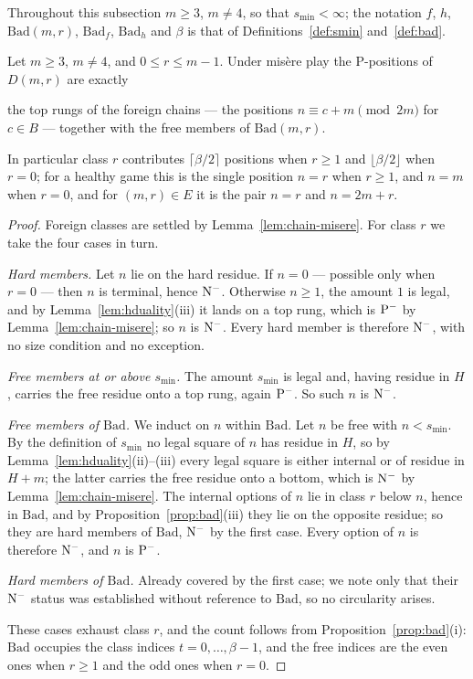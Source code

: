Throughout this subsection $m \ge 3$, $m \ne 4$, so that
$s_{\min} < \infty$; the notation $f$, $h$, $\mathrm{Bad}(m,r)$,
$\mathrm{Bad}_f$, $\mathrm{Bad}_h$ and $\beta$ is that of
Definitions~\ref{def:smin} and~\ref{def:bad}.

\begin{theorem}\label{thm:misere-main}
Let $m \ge 3$, $m \ne 4$, and $0 \le r \le m-1$. Under mis\`ere play the
P-positions of $D(m,r)$ are exactly

the top rungs of the foreign chains --- the positions
$n \equiv c + m \pmod{2m}$ for $c \in B$ --- together with the free
members of $\mathrm{Bad}(m,r)$.

In particular class $r$ contributes $\lceil \beta/2 \rceil$ positions
when $r \ge 1$ and $\lfloor \beta/2 \rfloor$ when $r = 0$; for a healthy
game this is the single position $n = r$ when $r \ge 1$, and $n = m$ when
$r = 0$, and for $(m,r) \in E$ it is the pair $n = r$ and $n = 2m + r$.
\end{theorem}
\begin{proof}
Foreign classes are settled by Lemma~\ref{lem:chain-misere}. For class
$r$ we take the four cases in turn.

\emph{Hard members.} Let $n$ lie on the hard residue. If $n = 0$ ---
possible only when $r = 0$ --- then $n$ is terminal, hence $\mathrm{N}^-$.
Otherwise $n \ge 1$, the amount $1$ is legal, and by
Lemma~\ref{lem:hduality}(iii) it lands on a top rung, which is $\mathrm{P}^-$ by
Lemma~\ref{lem:chain-misere}; so $n$ is $\mathrm{N}^-$. Every hard member is
therefore $\mathrm{N}^-$, with no size condition and no exception.

\emph{Free members at or above $s_{\min}$.} The amount $s_{\min}$ is
legal and, having residue in $H$, carries the free residue onto a top
rung, again $\mathrm{P}^-$. So such $n$ is $\mathrm{N}^-$.

\emph{Free members of $\mathrm{Bad}$.} We induct on $n$ within
$\mathrm{Bad}$. Let $n$ be free with $n < s_{\min}$. By the definition of
$s_{\min}$ no legal square of $n$ has residue in $H$, so by
Lemma~\ref{lem:hduality}(ii)--(iii) every legal square is either internal
or of residue in $H + m$; the latter carries the free residue onto a
bottom, which is $\mathrm{N}^-$ by Lemma~\ref{lem:chain-misere}. The internal
options of $n$ lie in class $r$ below $n$, hence in $\mathrm{Bad}$, and
by Proposition~\ref{prop:bad}(iii) they lie on the opposite residue; so
they are hard members of $\mathrm{Bad}$, $\mathrm{N}^-$ by the first case. Every
option of $n$ is therefore $\mathrm{N}^-$, and $n$ is $\mathrm{P}^-$.

\emph{Hard members of $\mathrm{Bad}$.} Already covered by the first case;
we note only that their $\mathrm{N}^-$ status was established without reference
to $\mathrm{Bad}$, so no circularity arises.

These cases exhaust class $r$, and the count follows from
Proposition~\ref{prop:bad}(i): $\mathrm{Bad}$ occupies the class indices
$t = 0, \dots, \beta-1$, and the free indices are the even ones when
$r \ge 1$ and the odd ones when $r = 0$.
\end{proof}


